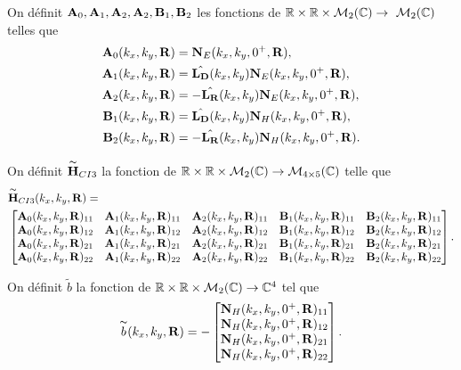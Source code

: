     \begin{defn}
      On définit \(\mathbf{A}_0,\mathbf{A}_1,\mathbf{A}_2,\mathbf{A}_2,\mathbf{B}_1,\mathbf{B}_2\) les fonctions de \(\mathbb R \times \mathbb R \times \mathcal{M}_2(\mathbb C) \rightarrow \ \mathcal{M}_2(\mathbb C)\) telles que        
      \begin{align*}
        \mathbf{A}_0(k_x,k_y,\mathbf{R}) &= \mathbf{N}_E(k_x,k_y,0^+,\mathbf{R}),
        \\
        \mathbf{A}_1(k_x,k_y,\mathbf{R}) &= \hat{\mathbf{L_D}}(k_x,k_y)\mathbf{N}_E(k_x,k_y,0^+,\mathbf{R}),
        \\
        \mathbf{A}_2(k_x,k_y,\mathbf{R}) &= -\hat{\mathbf{L_R}}(k_x,k_y)\mathbf{N}_E(k_x,k_y,0^+,\mathbf{R}),
        \\
        \mathbf{B}_1(k_x,k_y,\mathbf{R}) &= \hat{\mathbf{L_D}}(k_x,k_y)\mathbf{N}_H(k_x,k_y,0^+,\mathbf{R}),
        \\
        \mathbf{B}_2(k_x,k_y,\mathbf{R}) &= -\hat{\mathbf{L_R}}(k_x,k_y)\mathbf{N}_H(k_x,k_y,0^+,\mathbf{R}).            
      \end{align*}

      On définit \(\overset{\thicksim}{\mathbf{H}}_{CI3}\) la fonction de \(\mathbb R \times \mathbb R \times \mathcal{M}_2(\mathbb C) \rightarrow \mathcal{M}_{4\times5}(\mathbb C)\) telle que
      \begin{align*}
        & \overset{\thicksim}{\mathbf{H}}_{CI3}(k_x,k_y,\mathbf{R}) =  \\ &
        \begin{bmatrix}
          \mathbf{A}_0(k_x,k_y,\mathbf{R})_{11} & \mathbf{A}_1(k_x,k_y,\mathbf{R})_{11} & \mathbf{A}_2(k_x,k_y,\mathbf{R})_{11} & \mathbf{B}_1(k_x,k_y,\mathbf{R})_{11} & \mathbf{B}_2(k_x,k_y,\mathbf{R})_{11}
          \\
          \mathbf{A}_0(k_x,k_y,\mathbf{R})_{12} & \mathbf{A}_1(k_x,k_y,\mathbf{R})_{12} & \mathbf{A}_2(k_x,k_y,\mathbf{R})_{12} & \mathbf{B}_1(k_x,k_y,\mathbf{R})_{12} & \mathbf{B}_2(k_x,k_y,\mathbf{R})_{12}
          \\
          \mathbf{A}_0(k_x,k_y,\mathbf{R})_{21} & \mathbf{A}_1(k_x,k_y,\mathbf{R})_{21} & \mathbf{A}_2(k_x,k_y,\mathbf{R})_{21} & \mathbf{B}_1(k_x,k_y,\mathbf{R})_{21} & \mathbf{B}_2(k_x,k_y,\mathbf{R})_{21}
          \\
          \mathbf{A}_0(k_x,k_y,\mathbf{R})_{22} & \mathbf{A}_1(k_x,k_y,\mathbf{R})_{22} & \mathbf{A}_2(k_x,k_y,\mathbf{R})_{22} & \mathbf{B}_1(k_x,k_y,\mathbf{R})_{22} & \mathbf{B}_2(k_x,k_y,\mathbf{R})_{22}
        \end{bmatrix}.
      \end{align*}

      On définit \(\tilde{b}\) la fonction de \(\mathbb R \times \mathbb R \times \mathcal{M}_2(\mathbb C) \rightarrow \mathbb C^4\) tel que
      \begin{equation*}
        \overset{\thicksim}{b}(k_x,k_y,\mathbf{R}) = -
        \begin{bmatrix}
          \mathbf{N}_H(k_x,k_y,0^+,\mathbf{R})_{11}
          \\
          \mathbf{N}_H(k_x,k_y,0^+,\mathbf{R})_{12}
          \\
          \mathbf{N}_H(k_x,k_y,0^+,\mathbf{R})_{21}
          \\
          \mathbf{N}_H(k_x,k_y,0^+,\mathbf{R})_{22}
        \end{bmatrix}.
      \end{equation*}
    \end{defn}

